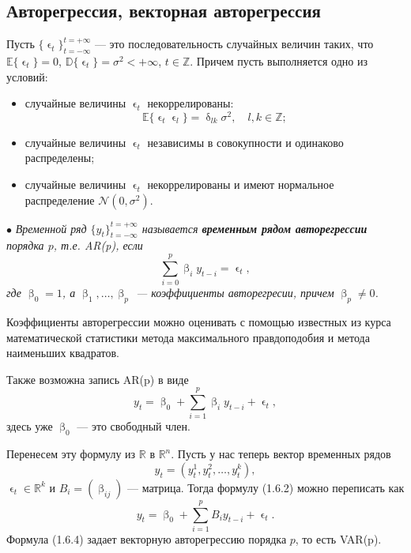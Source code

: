 \documentclass[a4paper, 12pt]{extarticle}
\numberwithin{equation}{subsection}
\newcommand{\Rm}{\mathbb{R}}
\newcommand{\Z}{\mathbb{Z}}
\renewcommand{\beta}{\upbeta}
\renewcommand{\delta}{\updelta}
\renewcommand{\epsilon}{\upvarepsilon}
\begin{document}
	\subsection{Авторегрессия, векторная авторегрессия}
	Пусть $\{\epsilon_t\}_{t=-\infty}^{t=+\infty}$ --- это последовательность случайных величин таких, что $\mathbb{E}\{\epsilon_t\} = 0$, $\mathbb{D}\{\epsilon_t\} = \sigma^2 < +\infty$, $t\in \Z$. Причем пусть выполняется одно из условий:
	\begin{itemize}
		\item случайные величины $\epsilon_t$ некоррелированы: $$\mathbb E \{ \epsilon _t \epsilon_l\} = \delta _{lk}\sigma^2,\quad l,k \in \mathbb Z;$$
		\item случайные величины $\epsilon_t$ независимы в совокупности и одинаково распределены;
		\item случайные величины $\epsilon_t$ некоррелированы и имеют нормальное распределение $\mathcal{N}(0,\sigma^2)$.
	\end{itemize}
	$\bullet$ \textit{Временной ряд $\{y_t\}_{t=-\infty}^{t=+\infty}$ называется \textbf{временным рядом авторегрессии} порядка $p$, т.е. AR(p), если} 
	\begin{equation}
		\sum_{i=0}^{p} \beta_i y_{t-i}= \epsilon_t,
	\end{equation} \textit{где $\beta_0 = 1$, а $\beta_1,\ldots, \beta_p$ --- коэффициенты авторегресии, причем $\beta_p \ne 0$.}
	
	Коэффициенты авторегрессии можно оценивать с помощью известных из курса математической статистики метода максимального правдоподобия и метода наименьших квадратов.
	
	Также возможна запись AR(p) в виде 
	\begin{equation}
		y_t = \beta_0 + \sum_{i=1}^{p} \beta_i y_{t-i}+ \epsilon_t,
	\end{equation} здесь уже $\beta_0$ --- это свободный член.
	
	Перенесем эту формулу из $\Rm$ в $\Rm^n$. Пусть у нас теперь вектор временных рядов 
	\begin{equation}
		y_t = (y_t^1, y_t^2,\ldots, y^k_t),
	\end{equation} $\epsilon_t\in \Rm^k$ и $B_i = (\beta_{ij})$ --- матрица. Тогда формулу (1.6.2) можно переписать как 
	\begin{equation}
	y_t = \beta_0 + \sum_{i=1}^{p}B_iy_{t-i} + \epsilon_t.
	\end{equation}
	Формула (1.6.4) задает векторную авторегрессию порядка $p$, то есть VAR(p). 
	
\end{document}
